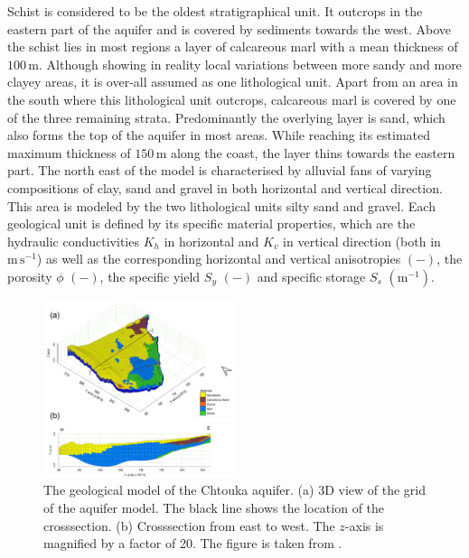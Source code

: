 Schist is considered to be the oldest stratigraphical unit. 
It outcrops in the eastern part of the aquifer and is covered by sediments towards the west. 
Above the schist lies in most regions a layer of calcareous marl with a mean thickness of $100 \, \textrm{m}$. 
Although showing in reality local variations between more sandy and more clayey areas, it is over-all assumed as one lithological unit. 
Apart from an area in the south where this lithological unit outcrops, calcareous marl is covered by one of the three remaining strata. 
Predominantly the overlying layer is sand, which also forms the top of the aquifer in most areas. 
While reaching its estimated maximum thickness of $150 \, \textrm{m}$ along the coast, the layer thins towards the eastern part. 
The north east of the model is characterised by alluvial fans of varying compositions of clay, sand and gravel in both horizontal and vertical direction. 
This area is modeled by the two lithological units silty sand and gravel. 
Each geological unit is defined by its specific material properties, which are the hydraulic conductivities $K_h$ in horizontal and $K_v$ in vertical direction (both in $\textrm{m} \, \textrm{s}^{-1}$) as well as the corresponding horizontal and vertical anisotropies $\left( - \right)$, the porosity $\phi$ $\left( - \right)$, the specific yield $S_y$ $\left( - \right)$ and specific storage $S_s$ $\left( \textrm{m}^{-1} \right)$.


\begin{figure}[b!]
    \centering
    \includegraphics[width=0.5\textwidth]{./img/Fig-GeoMod.png}
    \captionsetup{format=hang, labelfont=bf, textfont=it}
    \caption{The geological model of the Chtouka aquifer. (a) 3D view of the grid of the aquifer model. The black line shows the location of the crosssection. (b) Crosssection from east to west. The $z$-axis is magnified by a factor of 20. The figure is taken from \textcite{Horn.2021}.}
    \label{Fig-GeolMod}
\end{figure}

